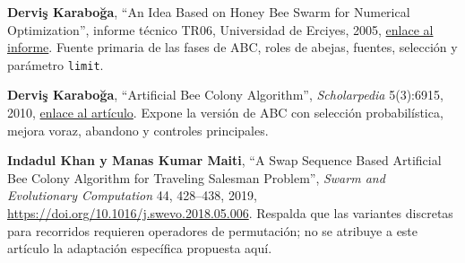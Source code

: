 \documentclass[11pt,letterpaper]{article}
\begin{document}
\begin{enumerate}[leftmargin=*,label={[\arabic*]},itemsep=3pt]
\item \textbf{Derviş Karaboğa}, ``An Idea Based on Honey Bee Swarm for Numerical Optimization'', informe técnico TR06, Universidad de Erciyes, 2005, \href{https://citeseerx.ist.psu.edu/document?doi=cf20e34a1402a115523910d2a4243929f6704db1&repid=rep1&type=pdf}{enlace al informe}. Fuente primaria de las fases de ABC, roles de abejas, fuentes, selección y parámetro \texttt{limit}.
\item \textbf{Derviş Karaboğa}, ``Artificial Bee Colony Algorithm'', \emph{Scholarpedia} 5(3):6915, 2010, \href{https://www.scholarpedia.org/article/Artificial_bee_colony_algorithm}{enlace al artículo}. Expone la versión de ABC con selección probabilística, mejora voraz, abandono y controles principales.
\item \textbf{Indadul Khan y Manas Kumar Maiti}, ``A Swap Sequence Based Artificial Bee Colony Algorithm for Traveling Salesman Problem'', \emph{Swarm and Evolutionary Computation} 44, 428--438, 2019, \url{https://doi.org/10.1016/j.swevo.2018.05.006}. Respalda que las variantes discretas para recorridos requieren operadores de permutación; no se atribuye a este artículo la adaptación específica propuesta aquí.
\end{enumerate}
\endgroup
\end{document}
